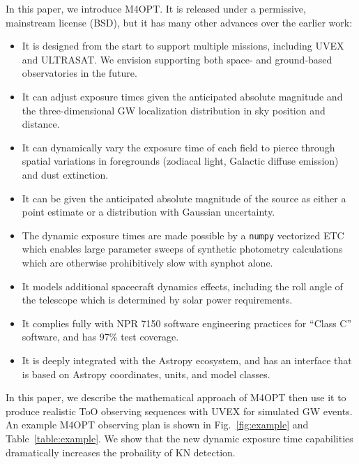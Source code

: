 \documentclass[twocolumn,times]{aastex631}
\begin{document}
In this paper, we introduce \ac{M4OPT}. It is released under a permissive, mainstream license (BSD), but it has many other advances over the earlier work:
%
\begin{itemize}
    \item It is designed from the start to support multiple missions, including \ac{UVEX} and ULTRASAT. We envision supporting both space- and ground-based observatories in the future.
    \item It can adjust exposure times given the anticipated absolute magnitude and the three-dimensional \ac{GW} localization distribution in sky position and distance.
    \item It can dynamically vary the exposure time of each field to pierce through spatial variations in foregrounds (zodiacal light, Galactic diffuse emission) and dust extinction.
    \item It can be given the anticipated absolute magnitude of the source as either a point estimate or a distribution with Gaussian uncertainty.
    \item The dynamic exposure times are made possible by a \texttt{numpy} \citep{harris2020array} vectorized \ac{ETC} which enables large parameter sweeps of synthetic photometry calculations which are otherwise prohibitively slow with synphot \citep{2018ascl.soft11001S} alone.
    \item It models additional spacecraft dynamics effects, including the roll angle of the telescope which is determined by solar power requirements.
    \item It complies fully with \ac{NPR} 7150 \citep{NPR7150} software engineering practices for ``Class C'' software, and has 97\% test coverage.
    \item It is deeply integrated with the Astropy \citep{2013A&A...558A..33A,2018AJ....156..123A} ecosystem, and has an interface that is based on Astropy coordinates, units, and model classes.
\end{itemize}

In this paper, we describe the mathematical approach of \ac{M4OPT} then use it to produce realistic \ac{ToO} observing sequences with \ac{UVEX} for simulated \ac{GW} events. An example \ac{M4OPT} observing plan is shown in Fig.~\ref{fig:example} and Table~\ref{table:example}. We show that the new dynamic exposure time capabilities dramatically increases the probaility of \ac{KN} detection.
\end{document}
